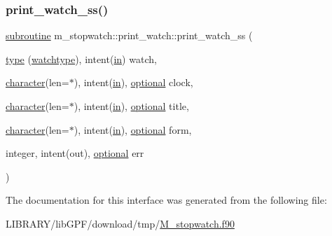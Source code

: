 \subsubsection{\texorpdfstring{print\+\_\+watch\+\_\+ss()}{print\_watch\_ss()}}
{\footnotesize\ttfamily \hyperlink{M__stopwatch_83_8txt_acfbcff50169d691ff02d4a123ed70482}{subroutine} m\+\_\+stopwatch\+::print\+\_\+watch\+::print\+\_\+watch\+\_\+ss (\begin{DoxyParamCaption}\item[{\hyperlink{stop__watch_83_8txt_a70f0ead91c32e25323c03265aa302c1c}{type} (\hyperlink{structm__stopwatch_1_1watchtype}{watchtype}), intent(\hyperlink{M__journal_83_8txt_afce72651d1eed785a2132bee863b2f38}{in})}]{watch,  }\item[{\hyperlink{option__stopwatch_83_8txt_abd4b21fbbd175834027b5224bfe97e66}{character}(len=$\ast$), intent(\hyperlink{M__journal_83_8txt_afce72651d1eed785a2132bee863b2f38}{in}), \hyperlink{option__stopwatch_83_8txt_aa4ece75e7acf58a4843f70fe18c3ade5}{optional}}]{clock,  }\item[{\hyperlink{option__stopwatch_83_8txt_abd4b21fbbd175834027b5224bfe97e66}{character}(len=$\ast$), intent(\hyperlink{M__journal_83_8txt_afce72651d1eed785a2132bee863b2f38}{in}), \hyperlink{option__stopwatch_83_8txt_aa4ece75e7acf58a4843f70fe18c3ade5}{optional}}]{title,  }\item[{\hyperlink{option__stopwatch_83_8txt_abd4b21fbbd175834027b5224bfe97e66}{character}(len=$\ast$), intent(\hyperlink{M__journal_83_8txt_afce72651d1eed785a2132bee863b2f38}{in}), \hyperlink{option__stopwatch_83_8txt_aa4ece75e7acf58a4843f70fe18c3ade5}{optional}}]{form,  }\item[{integer, intent(out), \hyperlink{option__stopwatch_83_8txt_aa4ece75e7acf58a4843f70fe18c3ade5}{optional}}]{err }\end{DoxyParamCaption})\hspace{0.3cm}{\ttfamily [private]}}



The documentation for this interface was generated from the following file\+:\begin{DoxyCompactItemize}
\item 
L\+I\+B\+R\+A\+R\+Y/lib\+G\+P\+F/download/tmp/\hyperlink{M__stopwatch_8f90}{M\+\_\+stopwatch.\+f90}\end{DoxyCompactItemize}
